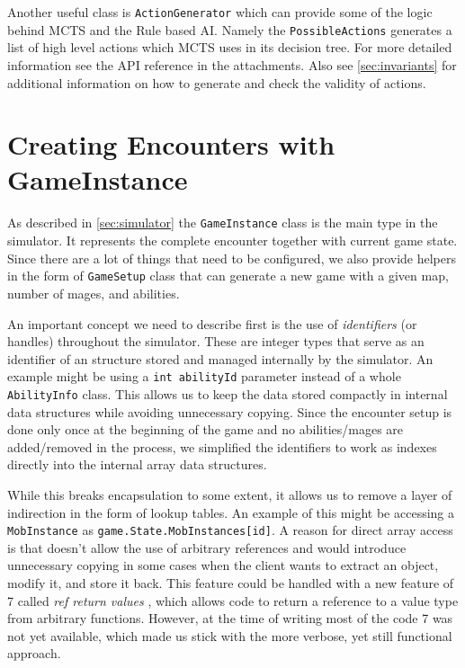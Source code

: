 Another useful class is \verb|ActionGenerator| which can provide some of the logic behind MCTS and the Rule based AI. Namely the \verb|PossibleActions| generates a list of high level actions which MCTS uses in its decision tree. For more detailed information see the API reference in the attachments. Also see \autoref{sec:invariants} for additional information on how to generate and check the validity of actions.

\section{Creating Encounters with GameInstance}

As described in \autoref{sec:simulator} the \verb|GameInstance| class is the main type in the simulator. It represents the complete encounter together with current game state. Since there are a lot of things that need to be configured, we also provide helpers in the form of \verb|GameSetup| class that can generate a new game with a given map, number of mages, and abilities. 

An important concept we need to describe first is the use of \emph{identifiers} (or handles) throughout the simulator. These are integer types that serve as an identifier of an structure stored and managed internally by the simulator. An example might be using a \verb|int abilityId| parameter instead of a whole \verb|AbilityInfo| class. This allows us to keep the data stored compactly in internal data structures while avoiding unnecessary copying. Since the encounter setup is done only once at the beginning of the game and no abilities/mages are added/removed in the process, we simplified the identifiers to work as indexes directly into the internal array data structures.

While this breaks encapsulation to some extent, it allows us to remove a layer of indirection in the form of lookup tables. An example of this might be accessing a \verb|MobInstance| as \verb|game.State.MobInstances[id]|. A reason for direct array access is that \Csh{} doesn't allow the use of arbitrary references and would introduce unnecessary copying in some cases when the client wants to extract an object, modify it, and store it back. This feature could be handled with a new feature of \Csh{} 7 called \emph{ref return values} \citep{csharp-7} , which allows code to return a reference to a value type from arbitrary functions. However, at the time of writing most of the code \Csh{} 7 was not yet available, which made us stick with the more verbose, yet still functional approach.

